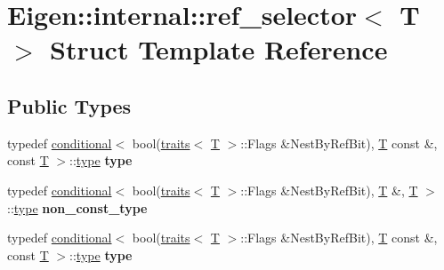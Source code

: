 \hypertarget{struct_eigen_1_1internal_1_1ref__selector}{}\section{Eigen\+:\+:internal\+:\+:ref\+\_\+selector$<$ T $>$ Struct Template Reference}
\label{struct_eigen_1_1internal_1_1ref__selector}
\subsection*{Public Types}
\begin{DoxyCompactItemize}
\item 
\mbox{\label{struct_eigen_1_1internal_1_1ref__selector_a21d6a5a42df0968101d42b6c79ed847b}} 
typedef \hyperlink{struct_eigen_1_1internal_1_1conditional}{conditional}$<$ bool(\hyperlink{struct_eigen_1_1internal_1_1traits}{traits}$<$ \hyperlink{group___sparse_core___module}{T} $>$\+::Flags \&Nest\+By\+Ref\+Bit), \hyperlink{group___sparse_core___module}{T} const  \&, const \hyperlink{group___sparse_core___module}{T} $>$\+::\hyperlink{class_eigen_1_1internal_1_1_tensor_lazy_evaluator_writable}{type} {\bfseries type}
\item 
\mbox{\label{struct_eigen_1_1internal_1_1ref__selector_a01ab072ffc5c112beb8021a3e8311b80}} 
typedef \hyperlink{struct_eigen_1_1internal_1_1conditional}{conditional}$<$ bool(\hyperlink{struct_eigen_1_1internal_1_1traits}{traits}$<$ \hyperlink{group___sparse_core___module}{T} $>$\+::Flags \&Nest\+By\+Ref\+Bit), \hyperlink{group___sparse_core___module}{T} \&, \hyperlink{group___sparse_core___module}{T} $>$\+::\hyperlink{class_eigen_1_1internal_1_1_tensor_lazy_evaluator_writable}{type} {\bfseries non\+\_\+const\+\_\+type}
\item 
\mbox{\label{struct_eigen_1_1internal_1_1ref__selector_a21d6a5a42df0968101d42b6c79ed847b}} 
typedef \hyperlink{struct_eigen_1_1internal_1_1conditional}{conditional}$<$ bool(\hyperlink{struct_eigen_1_1internal_1_1traits}{traits}$<$ \hyperlink{group___sparse_core___module}{T} $>$\+::Flags \&Nest\+By\+Ref\+Bit), \hyperlink{group___sparse_core___module}{T} const  \&, const \hyperlink{group___sparse_core___module}{T} $>$\+::\hyperlink{class_eigen_1_1internal_1_1_tensor_lazy_evaluator_writable}{type} {\bfseries type}

\end{DoxyCompactItemize}

